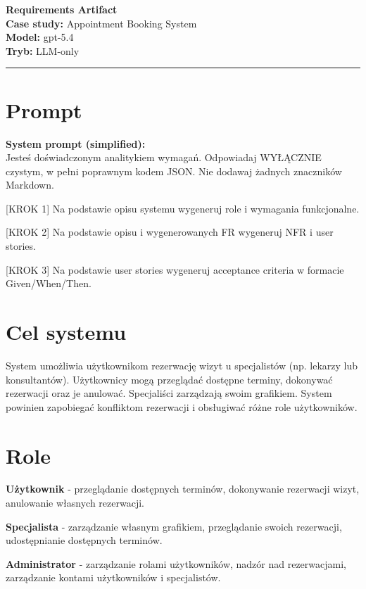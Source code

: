 \documentclass[12pt,a4paper]{article}
\begin{document}
\begin{center}
  {\LARGE\bfseries Requirements Artifact}\\[1.5em]
  {\large \textbf{Case study:} Appointment Booking System}\\[0.3em]
  {\large \textbf{Model:} gpt-5.4 \quad }\\[0.3em]
  {\large \textbf{Tryb:} LLM-only \quad }\\[0.3em]

\end{center}

\vspace{1em}\hrule\vspace{1.5em}

\section{Prompt}

\begin{mdframed}[backgroundcolor=metabg, linewidth=0pt, innerleftmargin=10pt, innerrightmargin=10pt, innertopmargin=8pt, innerbottommargin=8pt]
\textbf{System prompt (simplified):}\\
\small Jesteś doświadczonym analitykiem wymagań. Odpowiadaj WYŁĄCZNIE czystym, w pełni poprawnym kodem JSON. Nie dodawaj żadnych znaczników Markdown.

[KROK 1] 
Na podstawie opisu systemu wygeneruj role i wymagania funkcjonalne.

[KROK 2] 
Na podstawie opisu i wygenerowanych FR wygeneruj NFR i user stories.

[KROK 3] 
Na podstawie user stories wygeneruj acceptance criteria w formacie Given/When/Then.

\end{mdframed}


\section{Cel systemu}
System umożliwia użytkownikom rezerwację wizyt u specjalistów (np. lekarzy lub konsultantów). Użytkownicy mogą przeglądać dostępne terminy, dokonywać rezerwacji oraz je anulować. Specjaliści zarządzają swoim grafikiem. System powinien zapobiegać konfliktom rezerwacji i obsługiwać różne role użytkowników.


\section{Role}
\begin{imtemize}
    \item \textbf{Użytkownik} - przeglądanie dostępnych terminów, dokonywanie rezerwacji wizyt, anulowanie własnych rezerwacji.
    \item \textbf{Specjalista} - zarządzanie własnym grafikiem, przeglądanie swoich rezerwacji, udostępnianie dostępnych terminów.
    \item \textbf{Administrator} - zarządzanie rolami użytkowników, nadzór nad rezerwacjami, zarządzanie kontami użytkowników i specjalistów.
\end{imtemize}
\end{document}
